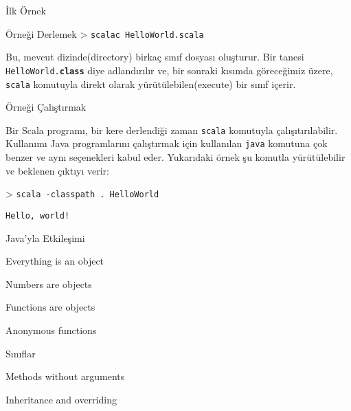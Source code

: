 \documentclass[10pt,a4paper]{book}
\begin{document}
\begin{chapter}{İlk Örnek}
\begin{section}{Örneği Derlemek}
> \texttt{scalac HelloWorld.scala}

Bu, mevcut dizinde(directory) birkaç sınıf dosyası oluşturur. Bir tanesi \texttt{HelloWorld.\textbf{class}} diye adlandırılır ve, bir sonraki kısımda göreceğimiz üzere, \texttt{scala} komutuyla direkt olarak yürütülebilen(execute) bir sınıf içerir.

\end{section}

\begin{section}{Örneği Çalıştırmak}

Bir Scala programı, bir kere derlendiği zaman \texttt{scala} komutuyla çalışıtırılabilir. Kullanımı Java programlarını çalıştırmak için kullanılan \texttt{java} komutuna çok benzer ve aynı seçenekleri kabul eder. Yukarıdaki örnek şu komutla yürütülebilir ve beklenen çıktıyı verir:

> \texttt{scala -classpath . HelloWorld}

\texttt{Hello, world!}

\end{section}

\end{chapter}

\begin{chapter}{Java'yla Etkileşimi}

\end{chapter}

\begin{chapter}{Everything is an object}

\begin{section}{Numbers are objects}

\end{section}

\begin{section}{Functions are objects}

\begin{subsection}{Anonymous functions}

\end{subsection}

\end{section}

\end{chapter}

\begin{chapter}{Sınıflar}

\begin{section}{Methods without arguments}

\end{section}

\begin{section}{Inheritance and overriding}

\end{section}

\end{chapter}
\end{document}

